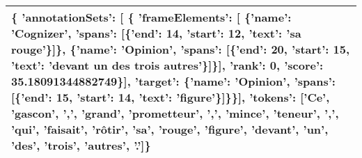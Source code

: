 \documentclass{article}%
\begin{document}
\begin{longtable}{|p{15.5cm}|}
              \{ 'annotationSets': {[} \{ 'frameElements': {[} \{'name': 'Cognizer', 'spans': {[}\{'end': 14, 'start': 12, 'text': 'sa rouge'\}{]}\},\newline%
                                                         \{'name': 'Opinion', 'spans': {[}\{'end': 20, 'start': 15, 'text': 'devant un des trois autres'\}{]}\}{]},\newline%
                                      'rank': 0,\newline%
                                      'score': 35.18091344882749\}{]},\newline%
                'target': \{'name': 'Opinion', 'spans': {[}\{'end': 15, 'start': 14, 'text': 'figure'\}{]}\}\}{]},\newline%
  'tokens': {[}'Ce', 'gascon', ',', 'grand', 'prometteur', ',', 'mince', 'teneur', ',', 'qui', 'faisait', 'rôtir', 'sa', 'rouge', 'figure', 'devant', 'un', 'des', 'trois', 'autres', '.'{]}\}\\%
\hline%
\end{longtable}

%
\end{document}
